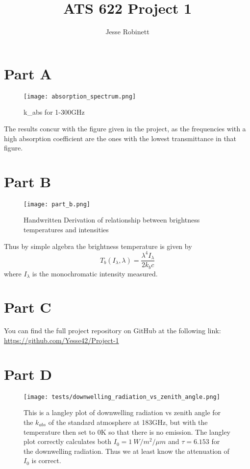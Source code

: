\documentclass{article}
\title{ATS 622 Project 1}
\author{Jesse Robinett}
\begin{document}
\maketitle

\section*{Part A}

\begin{figure}[H]
	\texttt{[image: absorption\_spectrum.png]}
    \caption{k\_abs for 1-300GHz}
\end{figure}

The results concur with the figure given in the project, as the frequencies with a high absorption coefficient are the ones with the lowest transmittance in that figure.

\section*{Part B}

\begin{figure}[H]
	\texttt{[image: part\_b.png]}
    \caption{Handwritten Derivation of relationship between brightness temperatures and intensities}
\end{figure}

Thus by simple algebra the brightness temperature is given by $$ T_b(I_\lambda, \lambda) = \frac{\lambda^4 I_\lambda}{2k_bc}$$ where $ I_\lambda $ is the monochromatic intensity measured.

\section*{Part C}

You can find the full project repository on GitHub at the following link: 
\href{https://github.com/Yesse42/Project-1}{https://github.com/Yesse42/Project-1}

\section*{Part D}

\begin{figure}[H]
    \texttt{[image: tests/downwelling\_radiation\_vs\_zenith\_angle.png]}
    \caption{This is a langley plot of downwelling radiation vs zenith angle for the $k_{abs}$ of the standard atmosphere at 183GHz, but with the temperature then set to 0K so that there is no emission. The langley plot correctly calculates both $I_0 = \qty{1}{W/m^2/\mu m}$ and $\tau = 6.153$ for the downwelling radiation. Thus we at least know the attenuation of $I_0$ is correct.}
\end{figure}
\end{document}
